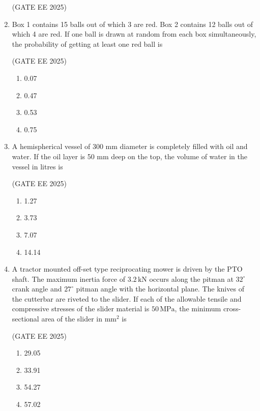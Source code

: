 \documentclass[journal,12pt,onecolumn]{IEEEtran}
\theoremstyle{remark}
\begin{document}
\begin{enumerate}
\hfill(GATE EE 2025)

\vspace{0.75cm}
\item Box 1 contains 15 balls out of which 3 are red. Box 2 contains 12 balls out of which 4 are red. If one ball is drawn at random from each box simultaneously, the probability of getting at least one red ball is\

\hfill(GATE EE 2025)

\begin{multicols}{4}
\begin{enumerate}
    \item 0.07
    \item 0.47
    \item 0.53
    \item 0.75
\end{enumerate}
\end{multicols}

\item A hemispherical vessel of 300 mm diameter is completely filled with oil and water. If the oil layer is 50 mm deep on the top, the volume of water in the vessel in litres is\

\hfill(GATE EE 2025)

\begin{multicols}{4}
\begin{enumerate}
    \item 1.27
    \item 3.73
    \item 7.07
    \item 14.14
\end{enumerate}
\end{multicols}

\item A tractor mounted off-set type reciprocating mower is driven by the PTO shaft. The maximum inertia force of $3.2\,\mathrm{kN}$ occurs along the pitman at $32^{\circ}$ crank angle and $27^{\circ}$ pitman angle with the horizontal plane. The knives of the cutterbar are riveted to the slider. If each of the allowable tensile and compressive stresses of the slider material is $50\,\mathrm{MPa}$, the minimum cross-sectional area of the slider in $\mathrm{mm^{2}}$ is\

\hfill(GATE EE 2025)

\begin{multicols}{4}
\begin{enumerate}
    \item 29.05
    \item 33.91
    \item 54.27
    \item 57.02
\end{enumerate}
\end{multicols}


\end{enumerate}
\end{document}
